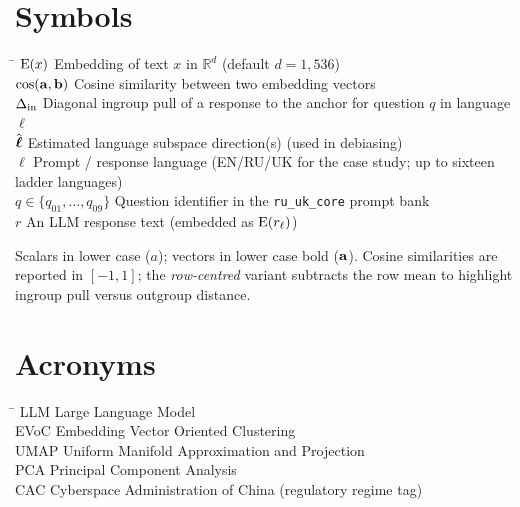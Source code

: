 \section*{Symbols}
  \begin{tabbing}
    \hspace*{2.4cm}   \= \kill
    $\mathrm{E}(x)$                \> Embedding of text $x$ in $\mathbb{R}^d$ (default $d{=}1{,}536$) \\[0.5ex]
    $\mathrm{cos}(\mathbf{a},\mathbf{b})$ \> Cosine similarity between two embedding vectors \\[0.5ex]
    $\Delta_{\mathrm{in}}$              \> Diagonal ingroup pull of a response to the anchor for question $q$ in language $\ell$ \\[0.5ex]
    $\hat{\boldsymbol{\ell}}$                 \> Estimated language subspace direction(s) (used in debiasing) \\[0.5ex]
    $\ell$                      \> Prompt / response language (EN/RU/UK for the case study; up to sixteen ladder languages) \\[0.5ex]
    $q \in \{q_{01}, \ldots, q_{09}\}$ \> Question identifier in the \texttt{ru\_uk\_core} prompt bank \\[0.5ex]
    $r$                         \> An LLM response text (embedded as $\mathrm{E}(r_\ell)$) \\[0.5ex]
  \end{tabbing}

Scalars in lower case ($a$); vectors in lower case bold
($\mathbf{a}$). Cosine similarities are
reported in $[-1, 1]$; the \emph{row-centred} variant subtracts the
row mean to highlight ingroup pull versus outgroup distance.

\section*{Acronyms}
  \begin{tabbing}
    \hspace*{2.4cm}  \= \kill
    LLM      \> Large Language Model \\[0.5ex]
    EVoC     \> Embedding Vector Oriented Clustering \\[0.5ex]
    UMAP     \> Uniform Manifold Approximation and Projection \\[0.5ex]
    PCA      \> Principal Component Analysis \\[0.5ex]
    CAC      \> Cyberspace Administration of China (regulatory regime tag) \\[0.5ex]
  \end{tabbing}

\clearpage
